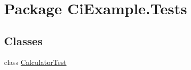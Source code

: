 \hypertarget{namespace_ci_example_1_1_tests}{\section{Package Ci\-Example.\-Tests}
\label{namespace_ci_example_1_1_tests}
}
\subsection*{Classes}
\begin{DoxyCompactItemize}
\item 
class \hyperlink{class_ci_example_1_1_tests_1_1_calculator_test}{Calculator\-Test}
\end{DoxyCompactItemize}
